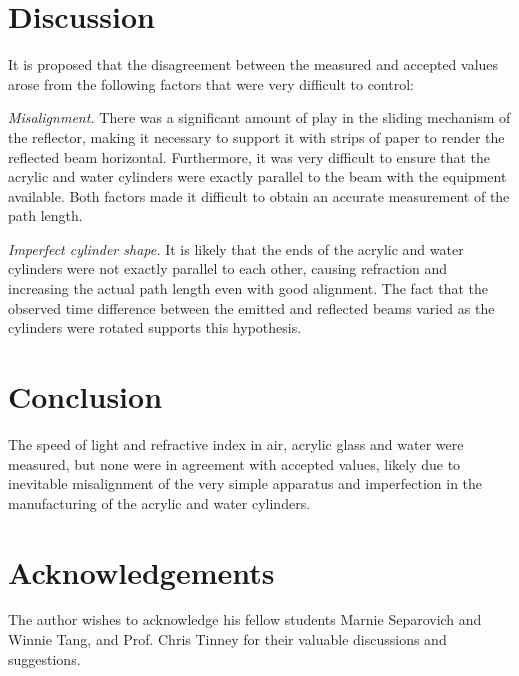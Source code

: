 \documentclass[
    aps,
    prl,
    reprint,
    10pt,
    amsmath,
    amssymb,
    a4paper,
    longbibliography
]{revtex4-2}
\begin{document}
\section{Discussion}

It is proposed that the disagreement between the measured and accepted
values arose from the following factors that were very difficult to
control:

\emph{Misalignment.} There was a significant amount of play in the
sliding mechanism of the reflector, making it necessary to support it
with strips of paper to render the reflected beam horizontal. Furthermore,
it was very difficult to ensure that the acrylic and water cylinders
were exactly parallel to the beam with the equipment available. Both
factors made it difficult to obtain an accurate measurement of the path
length.

\emph{Imperfect cylinder shape.} It is likely that the ends of the
acrylic and water cylinders were not exactly parallel to each other,
causing refraction and increasing the actual path length even with
good alignment. The fact that the observed time difference between
the emitted and reflected beams varied as the cylinders were rotated
supports this hypothesis.


\section{Conclusion}

The speed of light and refractive index in air, acrylic glass and water
were measured, but none were in agreement with accepted values, likely
due to inevitable misalignment of the very simple apparatus and
imperfection in the manufacturing of the acrylic and water cylinders.


\section{Acknowledgements}

The author wishes to acknowledge his fellow students Marnie Separovich
and Winnie Tang, and Prof. Chris Tinney for their valuable discussions
and suggestions.



\end{document}
